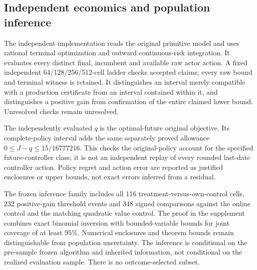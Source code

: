\subsection{Independent economics and population inference}
The independent implementation reads the original primitive model and uses
rational terminal optimization and outward continuous-risk integration. It
evaluates every distinct final, incumbent and available raw actor action.
A fixed independent 64/128/256/512-cell ladder checks accepted claims; every
raw bound and terminal witness is retained. It distinguishes an interval merely
compatible with a production certificate from an interval contained within it,
and distinguishes a positive gain from confirmation of the entire claimed
lower bound. Unresolved checks remain unresolved.

The independently evaluated $q$ is the optimal-future original objective.
Its complete-policy interval adds the same separately proved allowance
$0\le J-q\le15/16777216$. This checks the original-policy account for the
specified future-controller class; it is not an independent replay of every
rounded last-date controller action. Policy regret and action error are
reported as justified enclosures or upper bounds, not exact errors inferred
from a residual.

The frozen inference family includes all 116 treatment-versus-own-control
cells, 232 positive-gain threshold events and 348 signed comparisons against
the online control and the matching quadratic value control. The proof in the
supplement combines exact binomial inversion with bounded-variable bounds for
joint coverage of at least $95\%$. Numerical enclosures and theorem bounds
remain distinguishable from population uncertainty. The inference is conditional
on the pre-sample frozen algorithm and inherited information, not conditional
on the realized evaluation sample. There is no outcome-selected subset.

